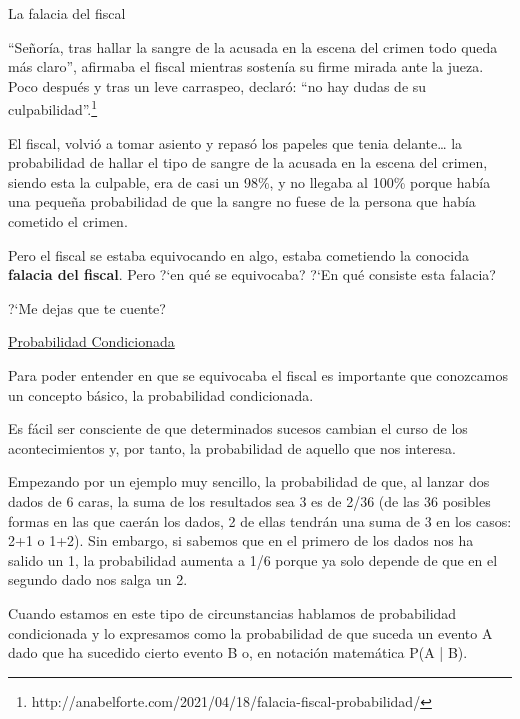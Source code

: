 \vspace{5mm}
\begin{myexampleblock}
{La falacia del fiscal}

\begin{small}
``Señoría, tras hallar la sangre de la acusada en la escena del crimen todo queda más claro”, afirmaba el fiscal mientras sostenía su firme mirada ante la jueza. Poco después y tras un leve carraspeo, declaró: “no hay dudas de su culpabilidad''.\footnote{ http://anabelforte.com/2021/04/18/falacia-fiscal-probabilidad/}

\vspace{2mm} El fiscal, volvió a tomar asiento y repasó los papeles que tenia delante… la probabilidad de hallar el tipo de sangre de la acusada en la escena del crimen, siendo esta la culpable, era de casi un 98\%, y no llegaba al 100\% porque había una pequeña probabilidad de que la sangre no fuese de la persona que había cometido el crimen.

\vspace{2mm} Pero el fiscal se estaba equivocando en algo, estaba cometiendo la conocida \textbf{falacia del fiscal}. Pero ?`en qué se equivocaba? ?`En qué consiste esta falacia?

\vspace{2mm} ?`Me dejas que te cuente?

\vspace{2mm} \underline{Probabilidad Condicionada}


\vspace{2mm} Para poder entender en que se equivocaba el fiscal es importante que conozcamos un concepto básico, la probabilidad condicionada.

\vspace{2mm} Es fácil ser consciente de que determinados sucesos cambian el curso de los acontecimientos y, por tanto, la probabilidad de aquello que nos interesa.

\vspace{2mm} Empezando por un ejemplo muy sencillo, la probabilidad de que, al lanzar dos dados de 6 caras, la suma de los resultados sea 3 es de 2/36 (de las 36 posibles formas en las que caerán los dados, 2 de ellas tendrán una suma de 3 en los casos:  2+1 o 1+2). Sin embargo, si sabemos que en el primero de los dados nos ha salido un 1, la probabilidad aumenta a 1/6 porque ya solo depende de que en el segundo dado nos salga un 2. 

\vspace{2mm} Cuando estamos en este tipo de circunstancias hablamos de probabilidad condicionada y lo expresamos como la probabilidad de que suceda un evento A dado que ha sucedido cierto evento B o, en notación matemática P(A | B).


\end{small}
\end{myexampleblock}
